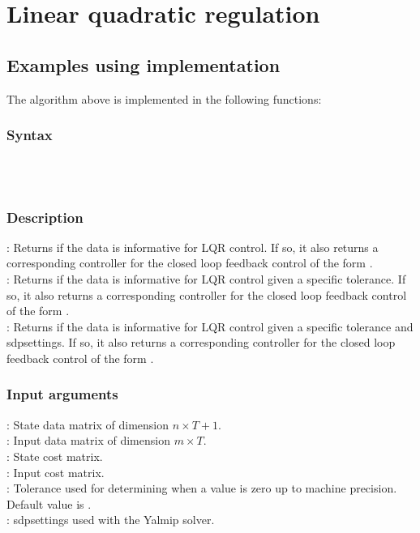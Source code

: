 \section{Linear quadratic regulation}










\subsection{Examples using implementation}
The algorithm above is implemented in the following functions:
\subsubsection*{Syntax}
 \\
 \\

\subsubsection*{Description}
: Returns if the data is informative for LQR control. If so, it also returns a corresponding controller  for the closed loop feedback control of the form .\\
: Returns if the data is informative for LQR control given a specific tolerance. If so, it also returns a corresponding controller  for the closed loop feedback control of the form .\\
: Returns if the data is informative for LQR control given a specific tolerance and sdpsettings. If so, it also returns a corresponding controller  for the closed loop feedback control of the form .

\subsubsection*{Input arguments}
\textbf{}: State data matrix of dimension $n \times T+1$.\\
\textbf{}: Input data matrix of dimension $m \times T$.\\
\textbf{}: State cost matrix.\\
\textbf{}: Input cost matrix.\\
\textbf{}: Tolerance used for determining when a value is zero up to machine precision. Default value is .\\
\textbf{}: sdpsettings used with the Yalmip solver.

